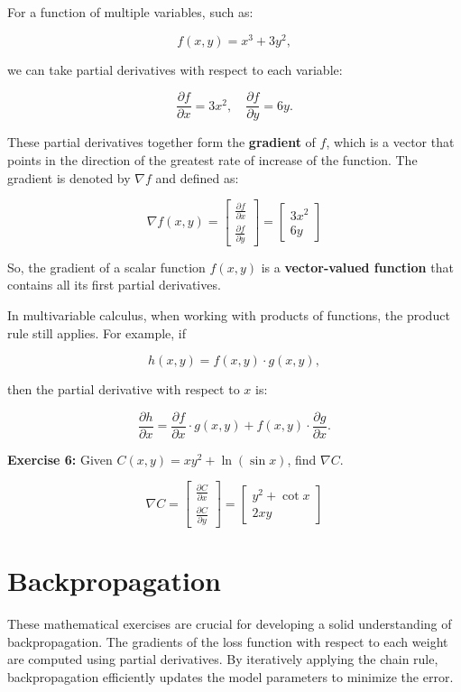 For a function of multiple variables, such as:

\[
f(x, y) = x^3 + 3y^2,
\]

we can take partial derivatives with respect to each variable:

\[
\frac{\partial f}{\partial x} = 3x^2, \quad \frac{\partial f}{\partial y} = 6y.
\]

These partial derivatives together form the \textbf{gradient} of \(f\), which is a vector that points in the direction of the greatest rate of increase of the function. The gradient is denoted by \(\nabla f\) and defined as:

\[
\nabla f(x, y) =
\begin{bmatrix}
    \frac{\partial f}{\partial x} \\
    \frac{\partial f}{\partial y}
\end{bmatrix}
=
\begin{bmatrix}
    3x^2 \\
    6y
\end{bmatrix}
\]

So, the gradient of a scalar function \(f(x, y)\) is a \textbf{vector-valued function} that contains all its first partial derivatives.

\bigskip

In multivariable calculus, when working with products of functions, the product rule still applies. For example, if

\[
h(x, y) = f(x, y) \cdot g(x, y),
\]

then the partial derivative with respect to \(x\) is:

\[
\frac{\partial h}{\partial x} = \frac{\partial f}{\partial x} \cdot g(x, y) + f(x, y) \cdot \frac{\partial g}{\partial x}.
\]

\textbf{Exercise 6:} Given $C(x, y) = xy^2 + \ln (\sin x)$, find $\nabla C$.

\[
\nabla C = 
\begin{bmatrix}
    \frac{\partial C}{\partial x} \\
    \frac{\partial C}{\partial y}
\end{bmatrix}
=
\begin{bmatrix}
    y^2 + \cot x \\
    2xy
\end{bmatrix}
\]

\section{Backpropagation}

These mathematical exercises are crucial for developing a solid understanding of backpropagation. The gradients of the loss function with respect to each weight are computed using partial derivatives. By iteratively applying the chain rule, backpropagation efficiently updates the model parameters to minimize the error.
